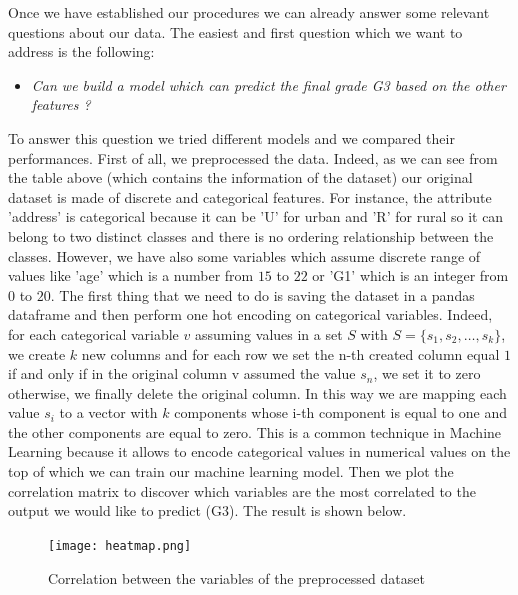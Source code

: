 \documentclass[a4paper, 11pt]{report}
\theoremstyle{definition}
\numberwithin{equation}{section}		%
\numberwithin{table}{section}				%
\begin{document}
Once we have established our procedures we can already answer some relevant questions about our data. The easiest and first question which we want to address is the following:
\begin{itemize}
\item \textit{Can we build a model which can predict the final grade G3 based on the other features ?}
\end{itemize}
To answer this question we tried different models and we compared their performances. First of all, we preprocessed the data. Indeed, as we can see from the table above (which contains the information of the dataset) our original dataset is made of discrete and categorical features. For instance, the attribute 'address' is categorical because it can be 'U' for urban and 'R' for rural so it can belong to two distinct classes and there is no ordering relationship between the classes. However, we have also some variables which assume discrete range of values like 'age' which is a number from $15$ to $22$ or 'G1' which is an integer from $0$ to $20$. The first thing that we need to do is saving the dataset in a pandas dataframe and then perform one hot encoding on categorical variables. Indeed, for each categorical variable $v$ assuming values in a set $S$ with $S=\{s_1,s_2,\dots, s_k\}$, we create $k$ new columns and for each row we set the n-th created column equal $1$ if and only if in the original column v assumed the value $s_n$, we set it to zero otherwise, we finally delete the original column. In this way we are mapping each value $s_i$ to a vector with $k$ components whose i-th component is equal to one and the other components are equal to zero. This is a common technique in Machine Learning because it allows to encode categorical values in numerical values on the top of which we can train our machine learning model. Then we plot the correlation matrix to discover which variables are the most correlated to the output we would like to predict (G3). The result is shown below. 
\begin{figure}[h]
\centering
\texttt{[image: heatmap.png]}
\caption{Correlation between the variables of the preprocessed dataset}
\end{figure}
\end{document}

